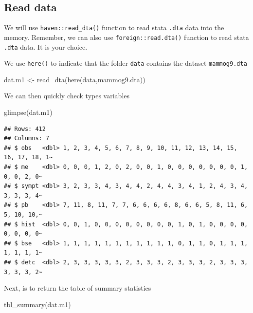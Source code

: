 \documentclass[
  10pt,
]{krantz}
\newenvironment{Shaded}{\begin{snugshade}}{\end{snugshade}}
\newcommand{\FunctionTok}[1]{\textcolor[rgb]{0.00,0.00,0.00}{#1}}
\newcommand{\NormalTok}[1]{#1}
\newcommand{\OtherTok}[1]{\textcolor[rgb]{0.56,0.35,0.01}{#1}}
\newcommand{\StringTok}[1]{\textcolor[rgb]{0.31,0.60,0.02}{#1}}
\begin{document}
\hypertarget{read-data-2}{%
\subsection{Read data}\label{read-data-2}}

We will use \texttt{haven::read\_dta()} function to read stata \texttt{.dta} data into the memory. Remember, we can also use \texttt{foreign::read.dta()} function to read stata \texttt{.dta} data. It is your choice.

We use \texttt{here()} to indicate that the folder \texttt{data} contains the dataset \texttt{mammog9.dta}

\begin{Shaded}
\begin{Highlighting}[]
\NormalTok{dat.m1 }\OtherTok{\textless{}{-}} \FunctionTok{read\_dta}\NormalTok{(}\FunctionTok{here}\NormalTok{(}\StringTok{\textquotesingle{}data\textquotesingle{}}\NormalTok{,}\StringTok{\textquotesingle{}mammog9.dta\textquotesingle{}}\NormalTok{))}
\end{Highlighting}
\end{Shaded}

We can then quickly check types variables

\begin{Shaded}
\begin{Highlighting}[]
\FunctionTok{glimpse}\NormalTok{(dat.m1)}
\end{Highlighting}
\end{Shaded}

\begin{verbatim}
## Rows: 412
## Columns: 7
## $ obs   <dbl> 1, 2, 3, 4, 5, 6, 7, 8, 9, 10, 11, 12, 13, 14, 15, 16, 17, 18, 1~
## $ me    <dbl> 0, 0, 0, 1, 2, 0, 2, 0, 0, 1, 0, 0, 0, 0, 0, 0, 0, 1, 0, 0, 2, 0~
## $ sympt <dbl> 3, 2, 3, 3, 4, 3, 4, 4, 2, 4, 4, 3, 4, 1, 2, 4, 3, 4, 3, 3, 3, 4~
## $ pb    <dbl> 7, 11, 8, 11, 7, 7, 6, 6, 6, 6, 8, 6, 6, 5, 8, 11, 6, 5, 10, 10,~
## $ hist  <dbl> 0, 0, 1, 0, 0, 0, 0, 0, 0, 0, 0, 1, 0, 1, 0, 0, 0, 0, 0, 0, 0, 0~
## $ bse   <dbl> 1, 1, 1, 1, 1, 1, 1, 1, 1, 1, 1, 0, 1, 1, 0, 1, 1, 1, 1, 1, 1, 1~
## $ detc  <dbl> 2, 3, 3, 3, 3, 3, 2, 3, 3, 3, 2, 3, 3, 3, 2, 3, 3, 3, 3, 3, 3, 2~
\end{verbatim}

Next, is to return the table of summary statistics

\begin{Shaded}
\begin{Highlighting}[]
\FunctionTok{tbl\_summary}\NormalTok{(dat.m1)}
\end{Highlighting}
\end{Shaded}
\end{document}
